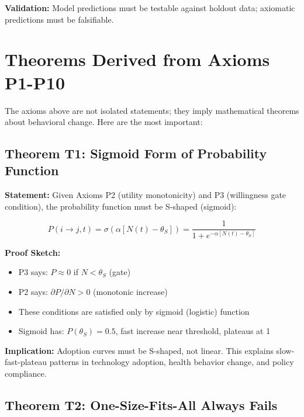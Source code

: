 \documentclass[11pt, a4paper]{article}
\begin{document}
\textbf{Validation:} Model predictions must be testable against holdout data; axiomatic predictions must be falsifiable.


\section{Theorems Derived from Axioms P1-P10}

The axioms above are not isolated statements; they imply mathematical theorems about behavioral change. Here are the most important:

\subsection{Theorem T1: Sigmoid Form of Probability Function}

\textbf{Statement:} Given Axioms P2 (utility monotonicity) and P3 (willingness gate condition), the probability function must be S-shaped (sigmoid):

\begin{equation}
P(i \to j, t) = \sigma\left( \alpha [N(t) - \theta_S] \right) = \frac{1}{1 + e^{-\alpha [N(t) - \theta_S]}}
\end{equation}

\textbf{Proof Sketch:}
\begin{itemize}[nosep]
    \item P3 says: $P \approx 0$ if $N < \theta_S$ (gate)
    \item P2 says: $\partial P / \partial N > 0$ (monotonic increase)
    \item These conditions are satisfied only by sigmoid (logistic) function
    \item Sigmoid has: $P(\theta_S) = 0.5$, fast increase near threshold, plateaus at 1
\end{itemize}

\textbf{Implication:} Adoption curves must be S-shaped, not linear. This explains slow-fast-plateau patterns in technology adoption, health behavior change, and policy compliance.

\subsection{Theorem T2: One-Size-Fits-All Always Fails}
\end{document}
